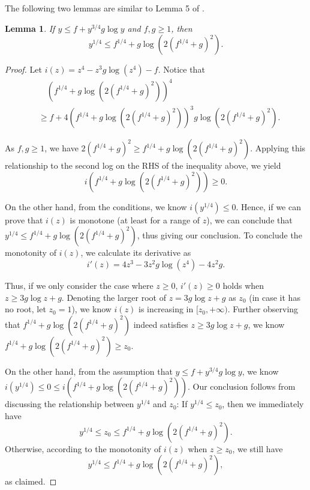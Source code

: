 \documentclass[11pt,fullpage,letterpaper]{article} %
\newtheorem{lemma}[theorem]{Lemma}
\begin{document}
The following two lemmas are similar to Lemma 5 of \citet{huang2023queue}.
\begin{lemma}\label{lem:3/4 with log self-bounding}
If $y\le f + y^{3/4} g \log y$ and $f,g\ge 1$, then
\begin{equation*}
y^{1/4}\le f^{1/4} + g \log \left (2(f^{1/4} + g)^2\right ).
\end{equation*}
\end{lemma}
\begin{proof}
Let $i(z) = z^4 - z^3 g \log (z^4) - f$. Notice that
\begin{align*}
&\quad \left (f^{1/4} + g \log \left (2(f^{1/4} + g)^2\right )\right )^4\\
&\ge f + 4 \left (f^{1/4} + g \log \left (2(f^{1/4} + g)^2\right )\right )^3 g \log \left (2(f^{1/4} + g)^2\right ).
\end{align*}

As $f,g\ge 1$, we have $2 (f^{1/4} + g)^2\ge f^{1/4} + g \log (2 (f^{1/4} + g)^2)$. Applying this relationship to the second log on the RHS of the inequality above, we yield
\begin{equation*}
i\left (f^{1/4} + g \log \left (2(f^{1/4} + g)^2\right )\right )\ge 0.
\end{equation*}

On the other hand, from the conditions, we know $i(y^{1/4})\le 0$. Hence, if we can prove that $i(z)$ is monotone (at least for a range of $z$), we can conclude that $y^{1/4}\le f^{1/4} + g \log \left (2(f^{1/4} + g)^2\right )$, thus giving our conclusion.
To conclude the monotonity of $i(z)$, we calculate its derivative as
\begin{equation*}
i'(z) = 4z^3 - 3z^2 g \log (z^4) - 4z^2 g.
\end{equation*}

Thus, if we only consider the case where $z\ge 0$, $i'(z)\ge 0$ holds when $z\ge 3g\log z + g$. Denoting the larger root of $z=3g\log z+g$ as $z_0$ (in case it has no root, let $z_0=1$), we know $i(z)$ is increasing in $[z_0,+\infty)$.
Further observing that $f^{1/4} + g \log \left (2(f^{1/4} + g)^2\right )$ indeed satisfies $z\ge 3g\log z + g$, we know $f^{1/4} + g \log \left (2(f^{1/4} + g)^2\right )\ge z_0$.

On the other hand, from the assumption that $y\le f + y^{3/4} g \log y$, we know $i(y^{1/4})\le 0\le i(f^{1/4} + g \log \left (2(f^{1/4} + g)^2\right ))$. Our conclusion follows from discussing the relationship between $y^{1/4}$ and $z_0$: If $y^{1/4}\le z_0$, then we immediately have
\begin{equation*}
y^{1/4}\le z_0\le f^{1/4} + g \log \left (2(f^{1/4} + g)^2\right ).
\end{equation*}
Otherwise, according to the monotonity of $i(z)$ when $z\ge z_0$, we still have
\begin{equation*}
y^{1/4}\le f^{1/4} + g \log \left (2(f^{1/4} + g)^2\right ),
\end{equation*}
as claimed.
\end{proof}
\end{document}
